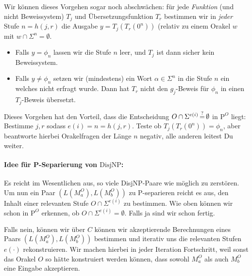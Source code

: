 \documentclass[nofonts]{uebung}
\def\P{\ensuremath{\mathrm{P}}}
\def\NP{\ensuremath{\mathrm{NP}}}
\def\DisjNP{\ensuremath{\mathrm{DisjNP}}}
\def\coNP{\ensuremath{\mathrm{coNP}}}
\begin{document}
Wir können dieses Vorgehen sogar noch abschwächen: für jede \emph{Funktion} (und nicht Beweissystem) $T_j$ und Übersetzungsfunktion $T_r$ bestimmen wir in \emph{jeder} Stufe $n=h(j,r)$ die Ausgabe $y=T_j(T_r(0^n))$ (relativ zu einem Orakel $w$ mit $w\cap\Sigma^n=\emptyset$.
\begin{itemize}
    \item Falls $y=\phi_n$ lassen wir die Stufe $n$ leer, und $T_j$ ist dann sicher kein Beweissystem.
    \item Falls $y\neq \phi_n$ setzen wir (mindestens) ein Wort $\alpha\in\Sigma^n$ in die Stufe $n$ ein welches nicht erfragt wurde. Dann hat $T_r$ nicht den $g_j$-Beweis für $\phi_n$ in einen $T_j$-Beweis übersetzt.
\end{itemize}
Dieses Vorgehen hat den Vorteil, dass die Entscheidung $O\cap\Sigma^{e(i)}\,\smash{\stackrel{?}{=}}\,\emptyset$ in $\P^O$ liegt: Bestimme $j,r$ sodass $e(i)=n=h(j,r)$. Teste ob $T_j(T_r(0^n))=\phi_n$, aber beantworte hierbei Orakelfragen der Länge $n$ negativ, alle anderen leitest Du weiter.



\paragraph{Idee für P-Separierung von $\DisjNP$:} 
Es reicht im Wesentlichen aus, so viele DisjNP-Paare wie möglich zu zerstören. 
Um nun ein Paar $(L(M_a^O), L(M_b^O))$ zu P-separieren reicht es aus, den Inhalt einer relevanten Stufe $O\cap\Sigma^{e(i)}$ zu bestimmen. 
Wie oben können wir schon in $\P^O$ erkennen, ob $O\cap\Sigma^{e(i)}=\emptyset$.
Falls ja sind wir schon fertig.

Falls nein, können wir über $C$ können wir akzeptierende Berechnungen eines Paars $(L(M_a^O), L(M_b^O))$ bestimmen und iterativ uns die relevanten Stufen $e(\cdot)$ rekonstruieren.
Wir machen hierbei in jeder Iteration Fortschritt, weil sonst das Orakel $O$ so hätte konstruiert werden können, dass sowohl $M_a^O$ als auch $M_b^O$ eine Eingabe akzeptieren.

\end{document}
